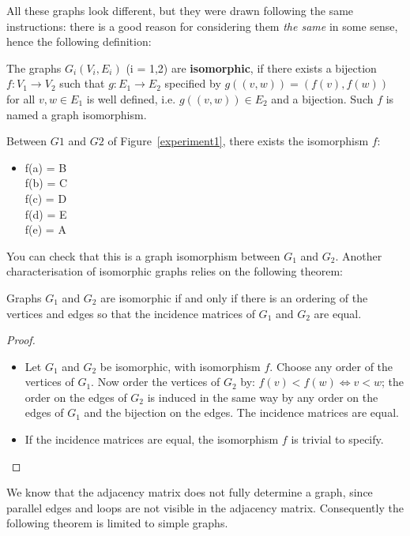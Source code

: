 All these graphs look different, but they were drawn following the
same instructions: there is a good reason for considering them {\em
the same} in some sense, hence the following definition:

\begin{definition}\label{isomorfegraphs}
\textup{The graphs $G_{i}(V_{i},E_{i})$ (i = 1,2) are
    \textbf{isomorphic}, if there exists a bijection $f: V_{1}
\rightarrow V_{2}$ such that $g: E_{1} \rightarrow E_{2}$ specified by
$g((v,w)) = (f(v),f(w))$ for all $v,w \in E_{1}$ is well defined,
i.e. $g((v,w)) \in E_{2}$ and a bijection.  Such $f$ is named a
graph isomorphism.}
\end{definition}

Between $G1$ and $G2$ of Figure~\ref{experiment1}, there exists
the isomorphism $f$:
\begin{itemize}
\item[]
f(a) = B\\
f(b) = C\\
f(c) = D\\
f(d) = E\\
f(e) = A
\end{itemize}

You can check that this is a graph isomorphism between $G_{1}$ and
$G_{2}$. Another characterisation of isomorphic graphs relies on the
following theorem:

\begin{theorem}
Graphs $G_{1}$ and $G_{2}$ are isomorphic if and only if there is an
ordering of the vertices and edges so that the incidence matrices of
$G_{1}$ and $G_{2}$ are equal.
\end{theorem}
\begin{proof}
\begin{itemize}
\item
Let $G_{1}$ and $G_{2}$ be isomorphic, with isomorphism $f$.
Choose any order of the vertices of $G_{1}$. Now order the vertices of
$G_{2}$ by: $f(v) < f(w) \Leftrightarrow v < w$; the order on the
edges of $G_{2}$ is induced in the same way by any order on the edges
of $G_{1}$ and the bijection on the edges. The incidence matrices are
equal.
\item If the incidence matrices are equal, the isomorphism $f$ is
trivial to specify.
\end{itemize}
\end{proof}

We know that the adjacency matrix does not fully determine a graph,
since parallel edges and loops are not visible in the adjacency
matrix. Consequently the following theorem is limited to simple
graphs.

